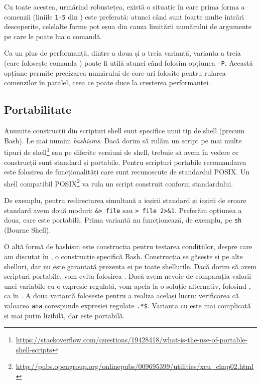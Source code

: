 \begin{note}[Important]
Cu toate acestea, urmărind robustețea, există o situație în care prima forma a comenzii  (liniile \texttt{1-5} din ) este preferată: atunci când sunt foarte multe intrări descoperite, celelalte forme pot eșua din cauza limitării numărului de argumente pe care le poate lua o comandă.
\end{note}

Ca un plus de performanță, dintre a doua și a treia variantă, varianta a treia (care folosește comanda ) poate fi utilă atunci când folosim opțiunea \texttt{-P}.
Această opțiune permite precizarea numărului de core-uri folosite pentru rularea comenzilor în paralel, ceea ce poate duce la creșterea performanței.

\subsection{Portabilitate}
\label{sec:auto:script-advanced:portable}

Anumite construcții din scripturi shell sunt specifice unui tip de shell (precum Bash).
Le mai numim \textit{bashisms}.
Dacă dorim să rulăm un script pe mai multe tipuri de shell\footnote{\url{https://stackoverflow.com/questions/19428418/what-is-the-use-of-portable-shell-scripts}} sau pe diferite versiuni de shell, trebuie să avem în vedere ce construcții sunt standard și portabile.
Pentru scripturi portabile recomandarea este folosirea de funcționalități care sunt recunoscute de standardul POSIX.
Un shell compatibil POSIX\footnote{\url{http://pubs.opengroup.org/onlinepubs/009695399/utilities/xcu\_chap02.html}} va rula un script construit conform standardului.

De exemplu, pentru redirectarea simultană a ieșirii standard și ieșirii de eroare standard avem două moduri: \verb|&> file| sau \verb|> file 2>&1|.
Preferăm opțiunea a doua, care este portabilă.
Prima variantă nu funcționează, de exemplu, pe \texttt{sh} (Bourne Shell).

O altă formă de bashism este construcția \cmd{$[[$} pentru testarea condițiilor, despre care am discutat în , o construcție specifică Bash.
Construcția se găsește și pe alte shelluri, dar nu este garantată prezența ei pe toate shellurile.
Dacă dorim să avem scripturi portabile, vom evita folosirea \cmd{$[[$}.
Dacă avem nevoie de comparația valorii unei variabile cu o expresie regulată, vom apela la o soluție alternativ, folosind , ca în .
A doua variantă folosește  pentru a realiza același lucru: verificarea că valoarea \texttt{ana} corespunde expresiei regulate \texttt{.*\$}.
Varianta cu  este mai complicată și mai puțin lizibilă, dar este portabilă.

